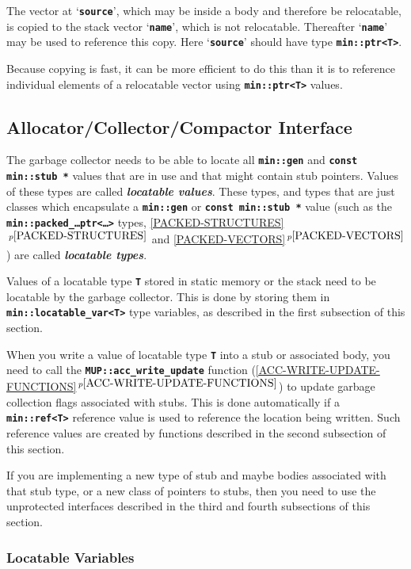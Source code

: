 \documentclass[12pt]{article}
\newcommand{\TT}[1]{{\tt \bfseries #1}}
\newcommand{\skey}[2]{{\bf \em #1#2}\index{#1}}
\newcommand{\itemref}[1]{\ref{#1}$\,^{p\pageref{#1}}$}
\newcommand{\EOL}{\penalty \exhyphenpenalty}
\begin{document}
The vector at `\TT{source}', which may be inside a body and therefore
be relocatable, is copied to the stack vector `\TT{name}', which
is not relocatable.
Thereafter `\TT{name}' may be used to reference this copy.
Here `\TT{source}' should have type \TT{min::ptr<T>}.

Because copying is fast, it can be more efficient to do this than
it is to reference individual elements of a relocatable vector using
\TT{min::ptr<T>} values.

\subsection{Allocator/Collector/Compactor Interface}
\label{ACC-INTERFACE}

The garbage collector needs to be able to locate all
\TT{min::gen} and \TT{const min::\EOL stub~*} values
that are in use and that might contain stub pointers.
Values of these types are called \skey{locatable value}s.%
\label{LOCATABLE-VALUE}
These types, and types that are just classes which
encapsulate a \TT{min::\EOL gen} or \TT{const min::\EOL stub~*}
value (such as the \TT{min::packed\_\ldots ptr<\ldots>} types,
\itemref{PACKED-STRUCTURES} and
\itemref{PACKED-VECTORS})
are called \skey{locatable type}s.%
\label{LOCATABLE-TYPE}

Values of a locatable type \TT{T} stored in static memory or the stack
need to be locatable by the garbage collector.  This is done
by storing them in \TT{min::\EOL locatable\_\EOL var<T>} type
variables, as described in the first subsection of this section.

When you write a value of locatable type \TT{T} into a stub or associated
body, you need to call the \TT{MUP::\EOL acc\_\EOL write\_\EOL update}
function (\itemref{ACC-WRITE-UPDATE-FUNCTIONS}) to update garbage
collection flags associated with stubs.
This is done automatically if a \TT{min::\EOL ref<T>} reference value is
used to reference the location being written.  Such reference values are created
by functions described in the second subsection of this section.

If you are implementing a new type of stub and maybe bodies
associated with that stub type, or a new class of pointers to stubs,
then you need to use the unprotected
interfaces described in the third and fourth subsections of this section.

\subsubsection{Locatable Variables}
\label{LOCATABLE-VARIABLES}
\end{document}
